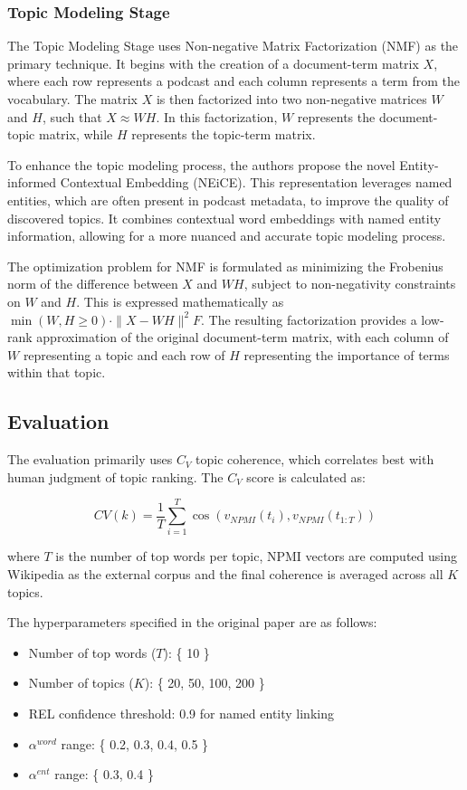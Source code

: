 \documentclass[manuscript]{acmart}
\begin{document}
\subsubsection{Topic Modeling Stage}

The Topic Modeling Stage uses Non-negative Matrix Factorization (NMF) as the primary technique. It begins with the creation of a document-term matrix $X$, where each row represents a podcast and each column represents a term from the vocabulary. The matrix $X$ is then factorized into two non-negative matrices $W$ and $H$, such that $X \approx WH$. In this factorization, $W$ represents the document-topic matrix, while $H$ represents the topic-term matrix.

To enhance the topic modeling process, the authors propose the novel Entity-informed Contextual Embedding (NEiCE). This representation leverages named entities, which are often present in podcast metadata, to improve the quality of discovered topics. It combines contextual word embeddings with named entity information, allowing for a more nuanced and accurate topic modeling process.

The optimization problem for NMF is formulated as minimizing the Frobenius norm of the difference between $X$ and $WH$, subject to non-negativity constraints on $W$ and $H$. This is expressed mathematically as $\min(W,H\geq0) \cdot \|X - WH\|^2 F$. The resulting factorization provides a low-rank approximation of the original document-term matrix, with each column of $W$ representing a topic and each row of $H$ representing the importance of terms within that topic.

\subsection{Evaluation}

The evaluation primarily uses $C_V$ topic coherence, which correlates best with human judgment of topic ranking. The $C_V$ score is calculated as:

$$ CV(k) = \frac{1}{T}\sum_{i=1}^{T} \cos(v_{NPMI}(t_i), v_{NPMI}(t_{1:T})) $$

where $T$ is the number of top words per topic, NPMI vectors are computed using Wikipedia as the external corpus and the final coherence is averaged across all $K$ topics.

The hyperparameters specified in the original paper are as follows:

\begin{itemize}
    \item Number of top words ($T$): \{ 10 \}
    \item Number of topics ($K$): \{ 20, 50, 100, 200 \}
    \item REL confidence threshold: 0.9 for named entity linking
    \item $\alpha^{word}$ range: \{ 0.2, 0.3, 0.4, 0.5 \}
    \item $\alpha^{ent}$ range: \{ 0.3, 0.4 \}
\end{itemize}
\end{document}
